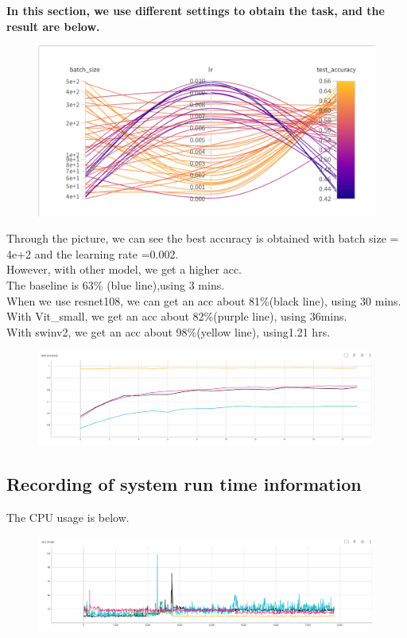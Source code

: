 \textbf{In this section, we use different settings to obtain the task, and the result are below.}
\begin{figure}[H]
    \centering
    \includegraphics[width=16cm]{Pasted image 20221127160754.png}
\end{figure}
Through the picture, we can see the best accuracy is obtained with batch size = 4e+2 and the learning rate =0.002.\\
However, with other model, we get a higher acc.\\
The baseline is 63\% (blue line),using 3 mins.\\
When we use resnet108, we can get an acc about 81\%(black line), using 30 mins.\\
With Vit_small, we get an acc about 82\%(purple line), using 36mins.\\
With swinv2, we get an acc about 98\%(yellow line), using1.21 hrs.\\
\begin{figure}[H]
    \centering
    \includegraphics[width=16cm]{Pasted image 20221127162523.png}
\end{figure}

\subsection{Recording of system run time information
}

The CPU usage is below.
\begin{figure}[H]
    \centering
    \includegraphics[width=16cm]{Pasted image 20221127163308.png}
\end{figure}

